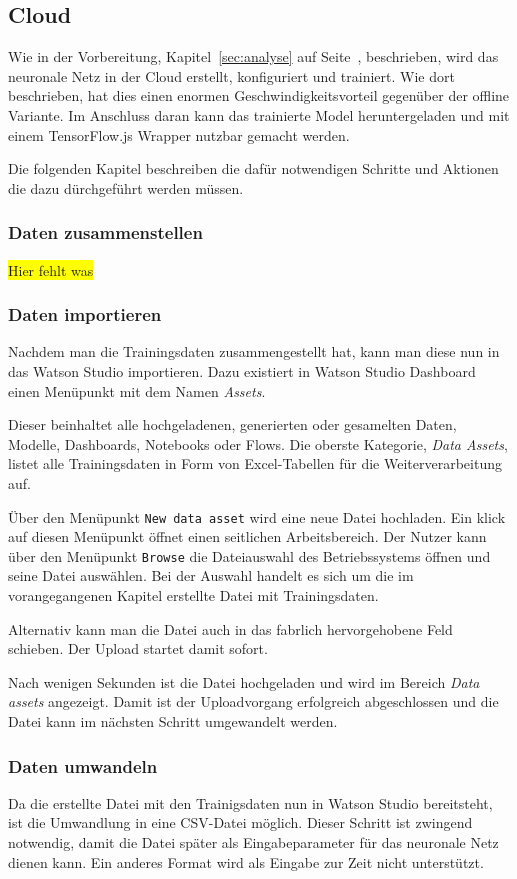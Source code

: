 \subsection{Cloud}
Wie in der Vorbereitung, Kapitel~\ref{sec:analyse} auf Seite~\pageref{sec:analyse}, beschrieben, wird das neuronale Netz
in der Cloud erstellt, konfiguriert und trainiert. Wie dort beschrieben, hat dies einen enormen Geschwindigkeitsvorteil
gegenüber der offline Variante. Im Anschluss daran kann das trainierte Model heruntergeladen und mit einem
TensorFlow.js Wrapper nutzbar gemacht werden.

Die folgenden Kapitel beschreiben die dafür notwendigen Schritte und Aktionen die dazu dürchgeführt werden müssen.

\subsubsection{Daten zusammenstellen}
\colorbox{yellow}{Hier fehlt was}

\subsubsection{Daten importieren}
Nachdem man die Trainingsdaten zusammengestellt hat, kann man diese nun in das Watson Studio importieren. Dazu existiert
in Watson Studio Dashboard einen Menüpunkt mit dem Namen \textit{Assets}.

Dieser beinhaltet alle hochgeladenen, generierten oder gesamelten Daten, Modelle, Dashboards, Notebooks oder Flows. Die
oberste Kategorie, \textit{Data Assets}, listet alle Trainingsdaten in Form von Excel-Tabellen für die Weiterverarbeitung
auf.

Über den Menüpunkt \texttt{New data asset} wird eine neue Datei hochladen. Ein klick auf diesen Menüpunkt öffnet einen
seitlichen Arbeitsbereich. Der Nutzer kann über den Menüpunkt \texttt{Browse} die Dateiauswahl des Betriebssystems
öffnen und seine Datei auswählen. Bei der Auswahl handelt es sich um die im vorangegangenen Kapitel erstellte Datei mit
Trainingsdaten.

Alternativ kann man die Datei auch in das fabrlich hervorgehobene Feld schieben. Der Upload startet damit sofort.

Nach wenigen Sekunden ist die Datei hochgeladen und wird im Bereich \textit{Data assets} angezeigt. Damit ist der
Uploadvorgang erfolgreich abgeschlossen und die Datei kann im nächsten Schritt umgewandelt werden.

\subsubsection{Daten umwandeln}
Da die erstellte Datei mit den Trainigsdaten nun in Watson Studio bereitsteht, ist die Umwandlung in eine CSV-Datei
möglich. Dieser Schritt ist zwingend notwendig, damit die Datei später als Eingabeparameter für das neuronale Netz dienen
kann. Ein anderes Format wird als Eingabe zur Zeit nicht unterstützt.

